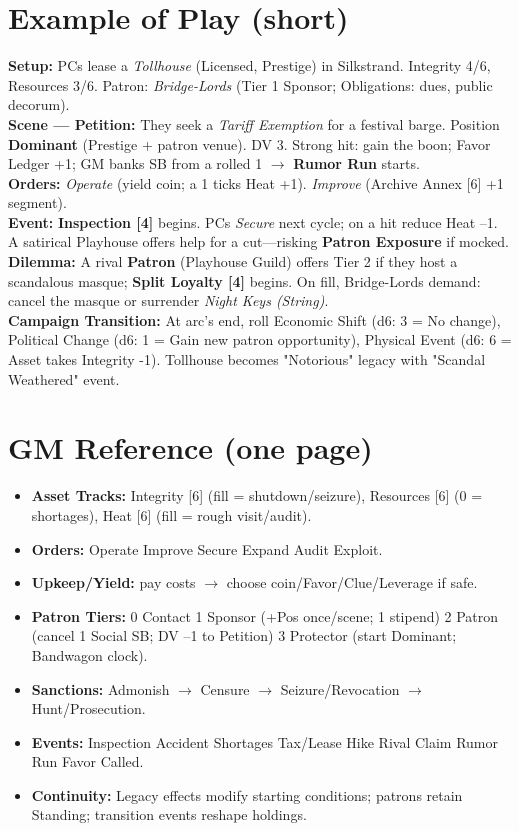   \section{Example of Play (short)}
  \textbf{Setup:} PCs lease a \emph{Tollhouse} (Licensed, Prestige) in Silkstrand. Integrity 4/6, Resources 3/6. Patron: \emph{Bridge-Lords} (Tier 1 Sponsor; Obligations: dues, public decorum).\\
  \textbf{Scene --- Petition:} They seek a \emph{Tariff Exemption} for a festival barge. Position \textbf{Dominant} (Prestige + patron venue). DV 3. Strong hit: gain the boon; Favor Ledger +1; GM banks SB from a rolled 1 $\to$ \textbf{Rumor Run} starts.\\
  \textbf{Orders:} \emph{Operate} (yield coin; a 1 ticks Heat +1). \emph{Improve} (Archive Annex [6] +1 segment).\\
  \textbf{Event:} \textbf{Inspection [4]} begins. PCs \emph{Secure} next cycle; on a hit reduce Heat --1. A satirical Playhouse offers help for a cut---risking \textbf{Patron Exposure} if mocked.\\
  \textbf{Dilemma:} A rival \textbf{Patron} (Playhouse Guild) offers Tier 2 if they host a scandalous masque; \textbf{Split Loyalty [4]} begins. On fill, Bridge-Lords demand: cancel the masque or surrender \emph{Night Keys (String)}.\\
  \textbf{Campaign Transition:} At arc's end, roll Economic Shift (d6: 3 = No change), Political Change (d6: 1 = Gain new patron opportunity), Physical Event (d6: 6 = Asset takes Integrity -1). Tollhouse becomes "Notorious" legacy with "Scandal Weathered" event.
  
  \section*{GM Reference (one page)}
  \begin{itemize}
    \item \textbf{Asset Tracks:} Integrity [6] (fill = shutdown/seizure), Resources [6] (0 = shortages), Heat [6] (fill = rough visit/audit).
    \item \textbf{Orders:} Operate \textbullet{} Improve \textbullet{} Secure \textbullet{} Expand \textbullet{} Audit \textbullet{} Exploit.
    \item \textbf{Upkeep/Yield:} pay costs $\to$ choose coin/Favor/Clue/Leverage if safe.
    \item \textbf{Patron Tiers:} 0 Contact \textbullet{} 1 Sponsor (+Pos once/scene; 1 stipend) \textbullet{} 2 Patron (cancel 1 Social SB; DV --1 to Petition) \textbullet{} 3 Protector (start Dominant; Bandwagon clock).
    \item \textbf{Sanctions:} Admonish $\to$ Censure $\to$ Seizure/Revocation $\to$ Hunt/Prosecution.
    \item \textbf{Events:} Inspection \textbullet{} Accident \textbullet{} Shortages \textbullet{} Tax/Lease Hike \textbullet{} Rival Claim \textbullet{} Rumor Run \textbullet{} Favor Called.
    \item \textbf{Continuity:} Legacy effects modify starting conditions; patrons retain Standing; transition events reshape holdings.
  \end{itemize}
  
